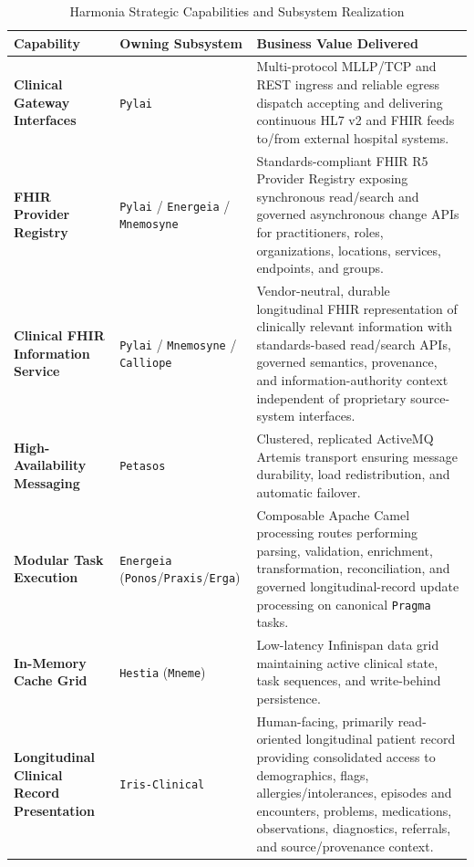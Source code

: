 \begin{table}[htbp]
\centering
\small
\begin{tabularx}{\textwidth}{l p{3.5cm} X}
\toprule
\textbf{Capability} & \textbf{Owning Subsystem} & \textbf{Business Value Delivered} \\
\midrule

\textbf{Clinical Gateway Interfaces}
& \texttt{Pylai}
& Multi-protocol MLLP/TCP and REST ingress and reliable egress dispatch accepting and delivering continuous HL7 v2 and FHIR feeds to/from external hospital systems. \\

\addlinespace
\textbf{FHIR Provider Registry}
& \texttt{Pylai} / \texttt{Energeia} / \texttt{Mnemosyne}
& Standards-compliant FHIR R5 Provider Registry exposing synchronous read/search and governed asynchronous change APIs for practitioners, roles, organizations, locations, services, endpoints, and groups. \\

\addlinespace
\textbf{Clinical FHIR Information Service}
& \texttt{Pylai} / \texttt{Mnemosyne} / \texttt{Calliope}
& Vendor-neutral, durable longitudinal FHIR representation of clinically relevant information with standards-based read/search APIs, governed semantics, provenance, and information-authority context independent of proprietary source-system interfaces. \\

\addlinespace
\textbf{High-Availability Messaging}
& \texttt{Petasos}
& Clustered, replicated ActiveMQ Artemis transport ensuring message durability, load redistribution, and automatic failover. \\

\addlinespace
\textbf{Modular Task Execution}
& \texttt{Energeia} (\texttt{Ponos}/\texttt{Praxis}/\texttt{Erga})
& Composable Apache Camel processing routes performing parsing, validation, enrichment, transformation, reconciliation, and governed longitudinal-record update processing on canonical \texttt{Pragma} tasks. \\

\addlinespace
\textbf{In-Memory Cache Grid}
& \texttt{Hestia} (\texttt{Mneme})
& Low-latency Infinispan data grid maintaining active clinical state, task sequences, and write-behind persistence. \\

\addlinespace
\textbf{Longitudinal Clinical Record Presentation}
& \texttt{Iris-Clinical}
& Human-facing, primarily read-oriented longitudinal patient record providing consolidated access to demographics, flags, allergies/intolerances, episodes and encounters, problems, medications, observations, diagnostics, referrals, and source/provenance context. \\

\bottomrule
\end{tabularx}
\caption{Harmonia Strategic Capabilities and Subsystem Realization}
\label{tab:strategic_capabilities}
\end{table}

